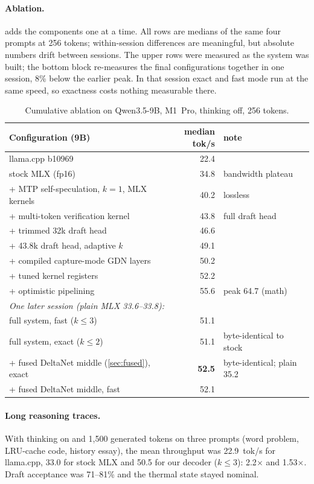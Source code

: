 \documentclass[11pt]{article}
\begin{document}
\paragraph{Ablation.}  adds the components one at a time. All rows are medians of the same four prompts at 256 tokens; within-session differences are meaningful, but absolute numbers drift between sessions. The upper rows were measured as the system was built; the bottom block re-measures the final configurations together in one session, 8\% below the earlier peak. In that session exact and fast mode run at the same speed, so exactness costs nothing measurable there.

\begin{table}[t]\centering\small
\begin{tabular}{lrl}\toprule
Configuration (9B) & median tok/s & note\\\midrule
llama.cpp b10969 & 22.4 & \\
stock MLX (fp16) & 34.8 & bandwidth plateau\\
+ MTP self-speculation, $k{=}1$, MLX kernels & 40.2 & lossless\\
+ multi-token verification kernel & 43.8 & full draft head\\
+ trimmed 32k draft head & 46.6 & \\
+ 43.8k draft head, adaptive $k$ & 49.1 & \\
+ compiled capture-mode GDN layers & 50.2 & \\
+ tuned kernel registers & 52.2 & \\
+ optimistic pipelining & 55.6 & peak 64.7 (math)\\
\midrule\multicolumn{3}{l}{\emph{One later session (plain MLX 33.6--33.8):}}\\
full system, fast ($k{\le}3$) & 51.1 & \\
full system, exact ($k{\le}2$) & 51.1 & byte-identical to stock\\
+ fused DeltaNet middle (\cref{sec:fused}), exact & \textbf{52.5} & byte-identical; plain 35.2\\
+ fused DeltaNet middle, fast & 52.1 & \\\bottomrule
\end{tabular}
\caption{Cumulative ablation on Qwen3.5-9B, M1~Pro, thinking off, 256 tokens.}
\label{tab:ablation}
\end{table}

\paragraph{Long reasoning traces.} With thinking on and 1{,}500 generated tokens on three prompts (word problem, LRU-cache code, history essay), the mean throughput was 22.9~tok/s for llama.cpp, 33.0 for stock MLX and 50.5 for our decoder ($k{\le}3$): 2.2$\times$ and 1.53$\times$. Draft acceptance was 71--81\% and the thermal state stayed nominal.
\end{document}
